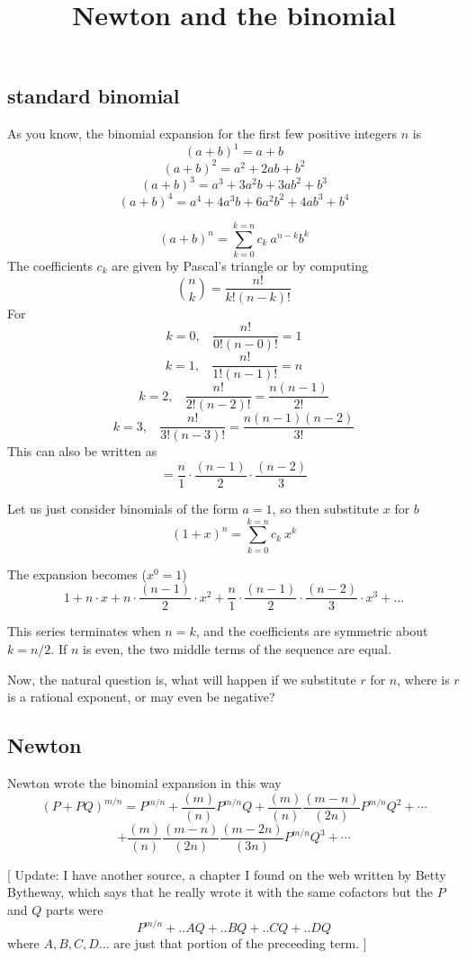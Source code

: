 \documentclass[11pt, oneside]{article}
\title{Newton and the binomial}
\date{}
\begin{document}
\maketitle
\Large


\subsection*{standard binomial}

As you know, the binomial expansion for the first few positive integers $n$ is
\[ (a+b)^1 = a + b \]
\[ (a+b)^2 = a^2 + 2ab + b^2 \]
\[ (a+b)^3 = a^3 + 3a^2b + 3ab^2 + b^3 \]
\[ (a+b)^4 = a^4 + 4a^3b + 6a^2b^2 + 4ab^3 + b^4 \]

\[ (a + b)^n = \sum_{k=0}^{k=n} c_k \ a^{n-k} b^{k} \]
The coefficients $c_k$ are given by Pascal's triangle or by computing
\[ \binom{n}{k} = \frac{n!}{k!(n-k)!}  \]
For 
\[ k = 0, \ \ \ \ \frac{n!}{0!(n-0)!} = 1 \]
\[ k = 1, \ \ \ \ \frac{n!}{1!(n-1)!} = n \]
\[ k = 2, \ \ \ \ \frac{n!}{2!(n-2)!} = \frac{n(n-1)}{2!} \]
\[ k = 3, \ \ \ \ \frac{n!}{3!(n-3)!} = \frac{n(n-1)(n-2)}{3!} \]
This can also be written as
\[ = \frac{n}{1} \cdot \frac{(n-1)}{2} \cdot \frac{(n-2)}{3} \]

Let us just consider binomials of the form $a = 1$, so then substitute $x$ for $b$
\[ (1 + x)^n = \sum_{k=0}^{k=n} c_k \ x^k \]

The expansion becomes ($x^0 = 1$)
\[ 1 + n \cdot x + n \cdot \frac{(n-1)}{2} \cdot x^2 + \frac{n}{1} \cdot \frac{(n-1)}{2} \cdot \frac{(n-2)}{3} \cdot x^3 + \dots \]

This series terminates when $n = k$, and the coefficients are symmetric about $k=n/2$.  If $n$ is even, the two middle terms of the sequence are equal.

Now, the natural question is, what will happen if we substitute $r$ for $n$, where is $r$ is a rational exponent, or may even be negative?

\subsection*{Newton}

Newton wrote the binomial expansion in this way
\[ (P + PQ)^{m/n} = P^{m/n} + \frac{(m)}{(n)}P^{m/n}Q + \frac{(m)}{(n)}\frac{(m-n)}{(2n)}P^{m/n}Q^2 + \cdots \]
\[ + \frac{(m)}{(n)}\frac{(m-n)}{(2n)}\frac{(m-2n)}{(3n)}P^{m/n}Q^3 + \cdots \] 

[ Update:  I have another source, a chapter I found on the web written by Betty Bytheway, which says that he really wrote it with the same cofactors but the $P$ and $Q$ parts were
\[ P^{m/n} + .. AQ + .. BQ + .. CQ + .. DQ \]
where $A,B,C,D \dots$ are just that portion of the preceeding term. ]
\end{document}
